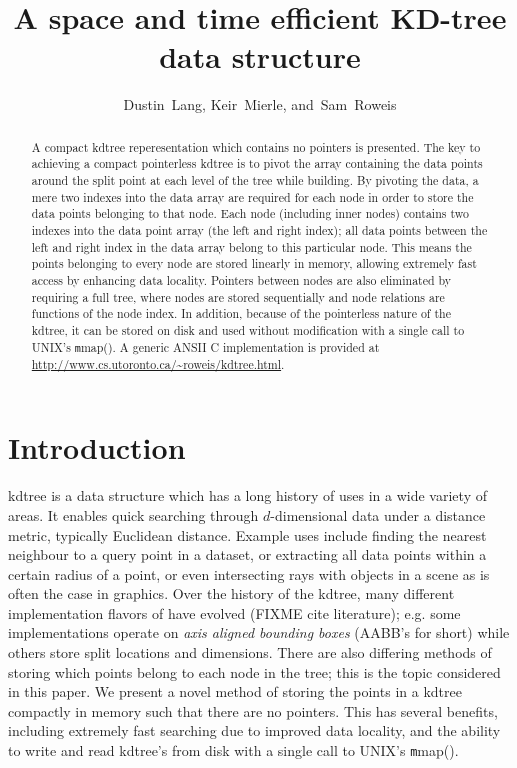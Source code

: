 \documentclass[journal]{IEEEtran}
\begin{document}
\title{A space and time efficient KD-tree data structure}
\author{Dustin~Lang,
        Keir~Mierle,
        and~Sam~Roweis}%
\maketitle

\begin{abstract}
A compact kdtree reperesentation which contains no pointers is presented. The
key to achieving a compact pointerless kdtree is to pivot the array containing
the data points around the split point at each level of the tree while
building. By pivoting the data, a mere two indexes into the data array are
required for each node in order to store the data points belonging to that
node.  Each node (including inner nodes) contains two indexes into the data
point array (the left and right index); all data points between the left and
right index in the data array belong to this particular node. This means the
points belonging to every node are stored linearly in memory, allowing
extremely fast access by enhancing data locality. Pointers between nodes are
also eliminated by requiring a full tree, where nodes are stored sequentially
and node relations are functions of the node index. In addition, because of the
pointerless nature of the kdtree, it can be stored on disk and used without
modification with a single call to UNIX's {\texttt mmap()}. A generic ANSII C
implementation is provided at \url{http://www.cs.utoronto.ca/~roweis/kdtree.html}.
\end{abstract}

\section{Introduction}
 kdtree is a data structure which has a long history of uses in a
wide variety of areas. It enables quick searching through $d$-dimensional data
under a distance metric, typically Euclidean distance.  Example uses
include finding the nearest neighbour to a query point in a dataset, or
extracting all data points within a certain radius of a point, or even
intersecting rays with objects in a scene as is often the case in graphics.
Over the history of the kdtree, many different implementation flavors of have
evolved (FIXME cite literature); e.g. some implementations operate on {\em axis
aligned bounding boxes} (AABB's for short) while others store split locations
and dimensions. There are also differing methods of storing which points belong
to each node in the tree; this is the topic considered in this paper. We
present a novel method of storing the points in a kdtree compactly in memory
such that there are no pointers. This has several benefits, including extremely
fast searching due to improved data locality, and the ability to write and read
kdtree's from disk with a single call to UNIX's {\texttt mmap()}.
\end{document}
